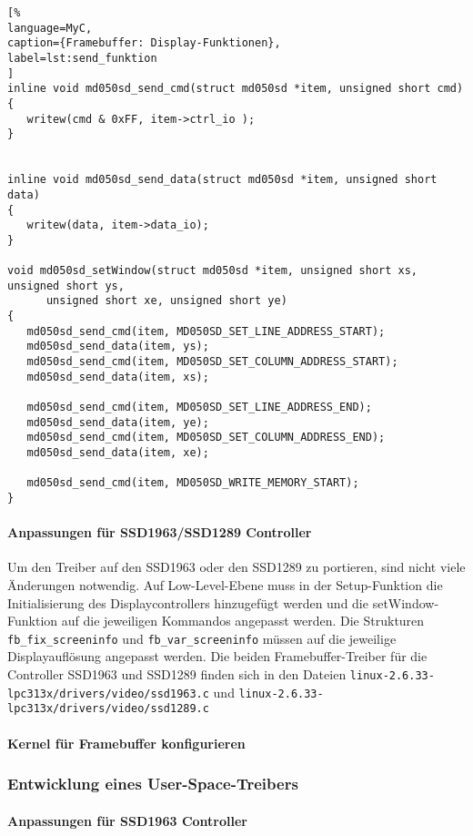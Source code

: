 \begin{lstlisting}[%
language=MyC,
caption={Framebuffer: Display-Funktionen},
label=lst:send_funktion
]
inline void md050sd_send_cmd(struct md050sd *item, unsigned short cmd)
{
   writew(cmd & 0xFF, item->ctrl_io );
}


inline void md050sd_send_data(struct md050sd *item, unsigned short data)
{
   writew(data, item->data_io);
}

void md050sd_setWindow(struct md050sd *item, unsigned short xs, unsigned short ys,
      unsigned short xe, unsigned short ye)
{
   md050sd_send_cmd(item, MD050SD_SET_LINE_ADDRESS_START);
   md050sd_send_data(item, ys);
   md050sd_send_cmd(item, MD050SD_SET_COLUMN_ADDRESS_START);
   md050sd_send_data(item, xs);

   md050sd_send_cmd(item, MD050SD_SET_LINE_ADDRESS_END);
   md050sd_send_data(item, ye);
   md050sd_send_cmd(item, MD050SD_SET_COLUMN_ADDRESS_END);
   md050sd_send_data(item, xe);

   md050sd_send_cmd(item, MD050SD_WRITE_MEMORY_START);
}
\end{lstlisting}
\newpage
\paragraph{Anpassungen für SSD1963/SSD1289 Controller}
Um den Treiber auf den SSD1963 oder den SSD1289 zu portieren, sind nicht viele Änderungen notwendig. Auf Low-Level-Ebene muss in der Setup-Funktion die Initialisierung des Displaycontrollers hinzugefügt werden und die setWindow-Funktion auf die jeweiligen Kommandos angepasst werden. 
Die Strukturen \lstinline|fb_fix_screeninfo| und \lstinline|fb_var_screeninfo| müssen auf die jeweilige Displayauflösung angepasst werden. Die beiden Framebuffer-Treiber für die Controller SSD1963 und SSD1289 finden sich in den Dateien \lstinline|linux-2.6.33-lpc313x/drivers/video/ssd1963.c| und \lstinline|linux-2.6.33-lpc313x/drivers/video/ssd1289.c|
\paragraph{Kernel für Framebuffer konfigurieren}

\subsubsection{Entwicklung eines User-Space-Treibers}

\paragraph{Anpassungen für SSD1963 Controller}
